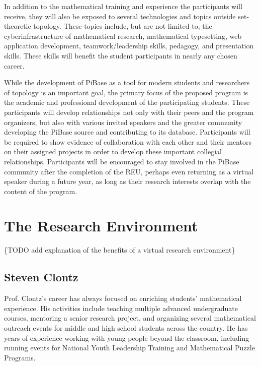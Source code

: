   In addition to the mathematical training and experience the participants will
  receive, they will also be exposed to several technologies and topics outside
  set-theoretic topology. These topics include, but are not limited to,
  the cyberinfrastructure of mathematical research, mathematical typesetting,
  web application development, teamwork/leadership skills, pedagogy,
  and presentation skills. These skills will benefit the student participants
  in nearly any chosen career.

  While the development of PiBase as a tool for modern students and researchers
  of topology is an important goal, the primary focus of the proposed program
  is the academic and professional development of the participating students.
  These participants will develop relationships not only with their peers
  and the program organizers, but also with various invited speakers and
  the greater community developing the PiBase source and contributing to its
  database. Participants will be
  required to show evidence of collaboration with
  each other and their mentors on their assigned projects in order
  to develop these important collegial relationships. Participants will be
  encouraged to stay involved in the PiBase community after the completion
  of the REU, perhaps even returning as a virtual speaker during a future year,
  as long as their research interests overlap with the content of the program.

\section{The Research Environment}

  \{TODO add explanation of the benefits of a virtual research environment\}

  \subsection{Steven Clontz}

    Prof. Clontz's career has always focused on enriching students' mathematical
    experience. His activities include teaching multiple advanced undergraduate
    courses, mentoring a senior research project, and organizing several
    mathematical outreach events for middle and high school students across the
    country. He has years of experience working with young people beyond the
    classroom, including running events for National Youth Leadership Training
    and Mathematical Puzzle Programs.

